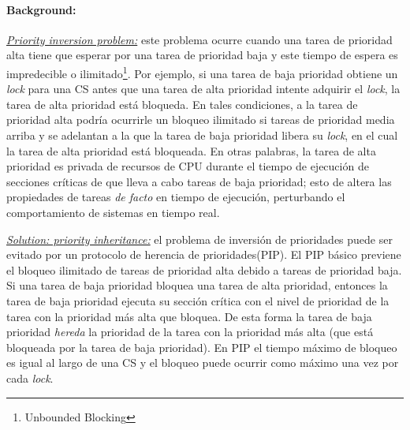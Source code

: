 \paragraph{\textnormal{\textbf{Background}:}} 
\underline{\textit{Priority inversion problem:}} este problema ocurre cuando una tarea de prioridad alta tiene que esperar por una tarea de prioridad baja y este tiempo de espera es impredecible o ilimitado\footnote{Unbounded Blocking}. Por ejemplo, si una tarea de baja prioridad obtiene un \textit{lock} para una CS antes que una tarea de alta prioridad intente adquirir el \textit{lock}, la tarea de alta prioridad está bloqueda. En tales condiciones, a la tarea de prioridad alta podría ocurrirle un bloqueo ilimitado si tareas de prioridad media arriba y se adelantan a la que la tarea de baja prioridad libera su \textit{lock}, en el cual la tarea de alta prioridad está bloqueada. En otras palabras, la tarea de alta prioridad es privada de recursos de CPU durante el tiempo de ejecución de secciones críticas de que lleva a cabo tareas de baja prioridad; esto de altera las propiedades de tareas \textit{de facto} en tiempo de ejecución, perturbando el comportamiento de sistemas en tiempo real.

\underline{\textit{Solution: priority inheritance:}} el problema de inversión de prioridades puede ser evitado por un protocolo de herencia de prioridades(PIP). El PIP básico previene el bloqueo ilimitado de tareas de prioridad alta debido a tareas de prioridad baja. Si una tarea de baja prioridad bloquea una tarea de alta prioridad, entonces la tarea de baja prioridad ejecuta su sección crítica con el nivel de prioridad de la tarea con la prioridad más alta que bloquea. De esta forma la tarea de baja prioridad \emph{hereda} la prioridad de la tarea con la prioridad más alta (que está bloqueada por la tarea de baja prioridad). En PIP el tiempo máximo de bloqueo es igual al largo de una CS y el bloqueo puede ocurrir como máximo una vez por cada \textit{lock}. 

